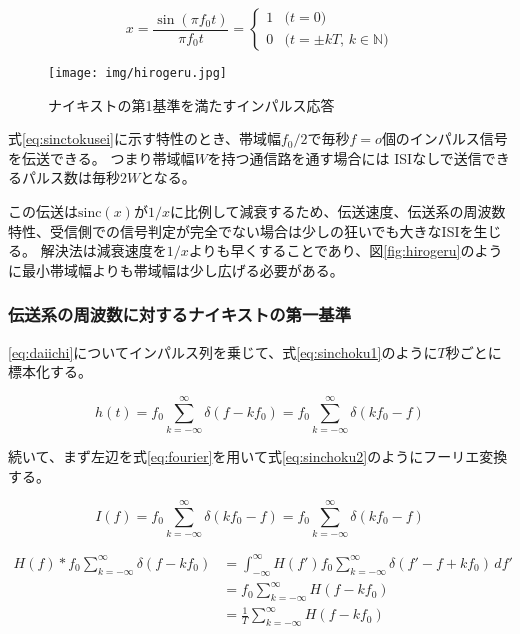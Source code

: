 \documentclass[twocolumn, dvipdfmx, 9pt]{jsarticle}
\begin{document}
\begin{equation}
\label{eq:sinctokusei}
x = \frac{\sin(\pi f_0 t)}{\pi f_0 t} =
\left\{
  \begin{array}{rl}
  1  & \text{($t = 0$)} \\
  0  & \text{($t = \pm kT$, $k \in \mathbb{N}$)}
  \end{array}
\right.
\end{equation}


  \begin{figure}[ht]
  \centering
  \texttt{[image: img/hirogeru.jpg]}
  \caption{ナイキストの第1基準を満たすインパルス応答}
  \label{fig:sinctokusei}
\end{figure}

式\eqref{eq:sinctokusei}に示す特性のとき、帯域幅$ f_0 / 2$で毎秒$f=o$個のインパルス信号を伝送できる。
つまり帯域幅$W$を持つ通信路を通す場合には
ISIなしで送信できるパルス数は毎秒$2W$となる。

この伝送は$ \mathrm{sinc} (x) $が$ 1/x$に比例して減衰するため、伝送速度、伝送系の周波数特性、受信側での信号判定が完全でない場合は少しの狂いでも大きなISIを生じる。
解決法は減衰速度を$1/x$よりも早くすることであり、図\ref{fig:hirogeru}のように最小帯域幅よりも帯域幅は少し広げる必要がある。





\subsubsection{伝送系の周波数に対するナイキストの第一基準}

\eqref{eq:daiichi}についてインパルス列を乗じて、式\eqref{eq:sinchoku1}のように$T$秒ごとに標本化する。

\begin{equation}
\label{eq:sinchoku1}
h(t) = f_0 \sum_{k=-\infty}^{\infty} \delta (f - k f_0) = f_0  \sum_{k=-\infty}^{\infty} \delta ( k f_0 - f)
\end{equation}

続いて、まず左辺を式\eqref{eq:fourier}を用いて式\eqref{eq:sinchoku2}のようにフーリエ変換する。

\begin{equation}
\label{eq:fourier}
I(f) = f_0 \sum_{k=-\infty}^{\infty} \delta( k f_0 - f) = f_0 \sum_{k=-\infty}^{\infty} \delta( k f_0 - f) 
\end{equation}

\begin{equation}
\begin{split}
\label{eq:sinchoku2}
H(f)  \ast f_0 \sum_{k=-\infty}^{\infty} \delta(f - k f_0) &= \int^{\infty}_{-\infty} H(f') f_0 \sum_{k=-\infty}^{\infty} \delta(f' - f + kf_0) \, df' \\
&= f_0 \sum_{k=-\infty}^{\infty} H(f - k f_0) \\ 
&= \frac{1}{T} \sum_{k=-\infty}^{\infty} H(f - k f_0) 
\end{split}
\end{equation}
\end{document}
